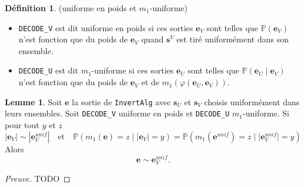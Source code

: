 \documentclass[12pt]{article}
\theoremstyle{definition}
\newtheorem{lemme}[thm]{Lemme}
\newtheorem{defi}[thm]{Définition}
\begin{document}
\begin{defi} (uniforme en poids et $m_1$-uniforme)
\begin{itemize}
\item \verb|DECODE_V| est dit uniforme en poids si ces sorties $\mathbf{e}_V$ sont telles que $\mathbb{P}(\mathbf{e}_V)$ n'est fonction que du poids de $\mathbf{e}_V$ quand $\mathbf{s}^V$ est tiré uniformément dans son ensemble.
\item \verb|DECODE_U| est dit $m_1$-uniforme si ces sorties $\mathbf{e}_U$ sont telles que $\mathbb{P}(\mathbf{e}_U\; |\;  \mathbf{e}_V)$ n'est fonction que du poids de $\mathbf{e}_V$ et de $m_1(\varphi(\mathbf{e}_U,\mathbf{e}_V))$.
\end{itemize}
\end{defi}

\begin{lemme} Soit $\mathbf{e}$ la sortie de \verb|InvertAlg| avec $\mathbf{s}_U$ et $\mathbf{s}_V$ choisis uniformément dans leurs ensembles. Soit \verb|DECODE_V| uniforme en poids et \verb|DECODE_U| $m_1$-uniforme. Si pour tout $y$ et $z$ 
$$|\mathbf{e}_V| \sim |\mathbf{e}_V^{unif}|\quad \text{et} \quad\mathbb{P}(m_1(\mathbf{e}) = z\; |\; |\mathbf{e}_V| = y) = \mathbb{P}(m_1(\mathbf{e}^{unif}) = z\; |\; |\mathbf{e}_V^{unif}| = y)$$
Alors
$$ \mathbf{e} \sim \mathbf{e}_V^{unif}.$$
\end{lemme}

\begin{proof}[Preuve] TODO
\end{proof}
\end{document}
